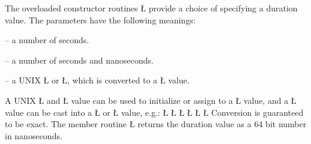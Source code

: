 \documentclass[openright,twoside]{report}
\begin{document}
The overloaded constructor routines \LGinlinetrue\LGbegin\lgrinde\L{}\endlgrinde\LGend{} provide a choice of specifying a duration value.
The parameters have the following meanings:
\begin{prefix}
\item[\LGinlinetrue\LGbegin\lgrinde\L{\LB{\V{sec}}}\endlgrinde\LGend{}] -- a number of seconds.
\item[\LGinlinetrue\LGbegin\lgrinde\L{\LB{\V{nsec}}}\endlgrinde\LGend{}] -- a number of seconds and nanoseconds.
\item[\LGinlinetrue\LGbegin\lgrinde\L{\LB{\V{timeval}}}\endlgrinde\LGend{} / \LGinlinetrue\LGbegin\lgrinde\L{\LB{\V{timespec}}}\endlgrinde\LGend{}] -- a UNIX \LGinlinetrue\LGbegin\lgrinde\L{}\endlgrinde\LGend{} or \LGinlinetrue\LGbegin\lgrinde\L{}\endlgrinde\LGend{}, which is converted to a \LGinlinetrue\LGbegin\lgrinde\L{}\endlgrinde\LGend{} value.
\end{prefix}

A UNIX \LGinlinetrue\LGbegin\lgrinde\L{}\endlgrinde\LGend{} and \LGinlinetrue\LGbegin\lgrinde\L{}\endlgrinde\LGend{} value can be used to initialize or assign to a \LGinlinetrue\LGbegin\lgrinde\L{}\endlgrinde\LGend{} value, and a \LGinlinetrue\LGbegin\lgrinde\L{}\endlgrinde\LGend{} value can be cast into a \LGinlinetrue\LGbegin\lgrinde\L{}\endlgrinde\LGend{} or \LGinlinetrue\LGbegin\lgrinde\L{}\endlgrinde\LGend{} value, e.g.:
\LGinlinefalse\LGbegin\lgrinde
\L{}
\CE{}\L{}
\CE{}\L{}
\CE{}\L{}
\CE{}\L{}
\CE{}\L{}
\CE{}\endlgrinde\LGend
Conversion is guaranteed to be exact.
The member routine \LGinlinetrue\LGbegin\lgrinde\L{}\endlgrinde\LGend{} returns the duration value as a 64 bit number in nanoseconds.
\end{document}
